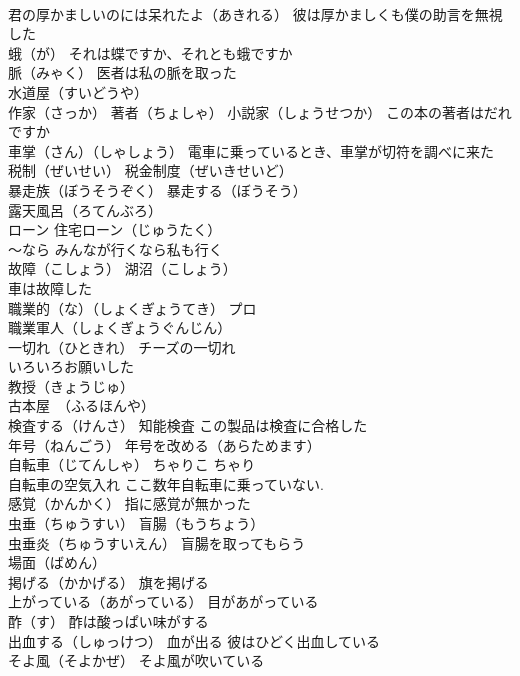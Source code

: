 \documentclass[8pt]{extreport}
\begin{document}
\begin{CJK}{UTF8}{min}
\\	君の厚かましいのには呆れたよ（あきれる） 彼は厚かましくも僕の助言を無視した
\\	蛾（が） それは蝶ですか、それとも蛾ですか
\\	脈（みゃく） 医者は私の脈を取った
\\	水道屋（すいどうや）
\\	作家（さっか） 著者（ちょしゃ） 小説家（しょうせつか） この本の著者はだれですか
\\	車掌（さん）（しゃしょう） 電車に乗っているとき、車掌が切符を調べに来た
\\	税制（ぜいせい） 税金制度（ぜいきせいど）
\\	暴走族（ぼうそうぞく） 暴走する（ぼうそう）
\\	露天風呂（ろてんぶろ）
\\	ローン 住宅ローン（じゅうたく）
\\	～なら みんなが行くなら私も行く
\\	故障（こしょう） 湖沼（こしょう）
\\	車は故障した
\\	職業的（な）（しょくぎょうてき） プロ
\\	職業軍人（しょくぎょうぐんじん）
\\	一切れ（ひときれ） チーズの一切れ
\\	いろいろお願いした
\\	教授（きょうじゅ）
\\	古本屋　（ふるほんや）
\\	検査する（けんさ） 知能検査 この製品は検査に合格した
\\	年号（ねんごう） 年号を改める（あらためます）
\\	自転車（じてんしゃ） ちゃりこ ちゃり　
\\	自転車の空気入れ ここ数年自転車に乗っていない.
\\	感覚（かんかく） 指に感覚が無かった
\\	虫垂（ちゅうすい） 盲腸（もうちょう）
\\	虫垂炎（ちゅうすいえん） 盲腸を取ってもらう
\\	場面（ばめん）
\\	掲げる（かかげる） 旗を掲げる
\\	上がっている（あがっている） 目があがっている
\\	酢（す） 酢は酸っぱい味がする
\\	出血する（しゅっけつ） 血が出る 彼はひどく出血している
\\	そよ風（そよかぜ） そよ風が吹いている

\end{CJK}
\end{document}
